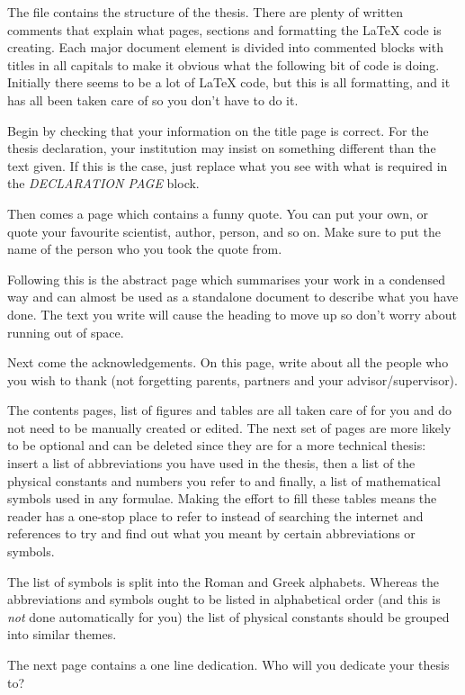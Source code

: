 The  file contains the structure of the thesis. There are plenty of written comments that explain what pages, sections and formatting the \LaTeX{} code is creating. Each major document element is divided into commented blocks with titles in all capitals to make it obvious what the following bit of code is doing. Initially there seems to be a lot of \LaTeX{} code, but this is all formatting, and it has all been taken care of so you don't have to do it.

Begin by checking that your information on the title page is correct. For the thesis declaration, your institution may insist on something different than the text given. If this is the case, just replace what you see with what is required in the \emph{DECLARATION PAGE} block.

Then comes a page which contains a funny quote. You can put your own, or quote your favourite scientist, author, person, and so on. Make sure to put the name of the person who you took the quote from.

Following this is the abstract page which summarises your work in a condensed way and can almost be used as a standalone document to describe what you have done. The text you write will cause the heading to move up so don't worry about running out of space.

Next come the acknowledgements. On this page, write about all the people who you wish to thank (not forgetting parents, partners and your advisor/supervisor).

The contents pages, list of figures and tables are all taken care of for you and do not need to be manually created or edited. The next set of pages are more likely to be optional and can be deleted since they are for a more technical thesis: insert a list of abbreviations you have used in the thesis, then a list of the physical constants and numbers you refer to and finally, a list of mathematical symbols used in any formulae. Making the effort to fill these tables means the reader has a one-stop place to refer to instead of searching the internet and references to try and find out what you meant by certain abbreviations or symbols.

The list of symbols is split into the Roman and Greek alphabets. Whereas the abbreviations and symbols ought to be listed in alphabetical order (and this is \emph{not} done automatically for you) the list of physical constants should be grouped into similar themes.

The next page contains a one line dedication. Who will you dedicate your thesis to?

